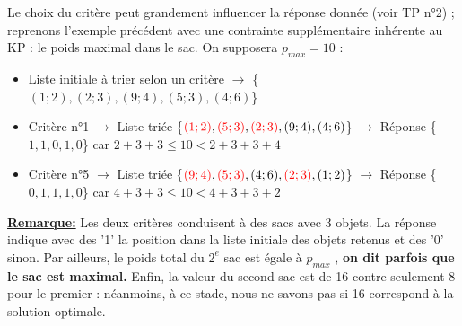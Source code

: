 \documentclass[12pt,french]{article}
\begin{document}
Le choix du critère peut grandement influencer la réponse donnée (voir TP n°2) ; reprenons l'exemple précédent avec une contrainte supplémentaire inhérente au KP  : le poids maximal dans le sac. On supposera $ p_{max} =10$ :
\begin{itemize}
	\item Liste initiale à trier selon un critère $\rightarrow$ \{$(1;2), (2;3), (9;4), (5;3), (4;6)$\}
	\item Critère n°1 $\rightarrow$ Liste triée \{$\textcolor{red}{(1;2)},\textcolor{red}{(5;3)}, \textcolor{red}{(2;3)}, (9;4), (4;6)$\} $\rightarrow$ Réponse \{$1,1,0,1,0$\} car $2+3+3 \le 10 < 2+3+3+4$
	\item Critère n°5 $\rightarrow$ Liste triée \{$\textcolor{red}{(9;4)},\textcolor{red}{(5;3)},(4;6),\textcolor{red}{(2;3)}, (1;2)  $\} $\rightarrow$ Réponse \{$0,1,1,1,0$\} car $4+3+3 \le 10 < 4+3+3+2$
\end{itemize} 
\vspace{2mm}
\underline{\textbf{Remarque:}} Les deux critères conduisent à des sacs avec 3 objets. La réponse indique avec des '1' la position dans la liste initiale des objets retenus et des '0' sinon. Par ailleurs, le poids total du $2^e$ sac est égale à $p_{max}$ , \textbf{on dit parfois que le sac est maximal.} Enfin, la valeur du second sac est de 16 contre seulement 8 pour le premier : néanmoins, à ce stade, nous ne savons pas si 16 correspond à la solution optimale.\\
\vskip0.2cm
\end{document}
